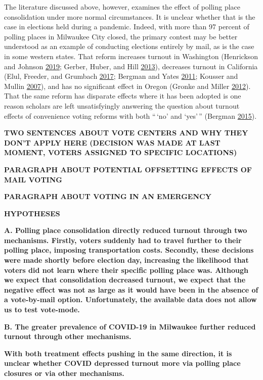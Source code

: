 \documentclass[
  12pt,
]{article}
\begin{document}
The literature discussed above, however, examines the effect of polling place consolidation under more normal circumstances. It is unclear whether that is the case in elections held during a pandemic. Indeed, with more than 97 percent of polling places in Milwaukee City closed, the primary contest may be better understood as an example of conducting elections entirely by mail, as is the case in some western states. That reform increases turnout in Washington (Henrickson and Johnson \protect\hyperlink{ref-Henrickson2019}{2019}; Gerber, Huber, and Hill \protect\hyperlink{ref-Gerber2013}{2013}), decreases turnout in California (Elul, Freeder, and Grumbach \protect\hyperlink{ref-Elul2017}{2017}; Bergman and Yates \protect\hyperlink{ref-Bergman2011}{2011}; Kousser and Mullin \protect\hyperlink{ref-Kousser2007}{2007}), and has no significant effect in Oregon (Gronke and Miller \protect\hyperlink{ref-Gronke2012}{2012}). That the same reform has disparate effects where it has been adopted is one reason scholars are left unsatisfyingly answering the question about turnout effects of convenience voting reforms with both ``\,`no' and `yes'\,'' (Bergman \protect\hyperlink{ref-Bergman2015}{2015}).

\textbf{TWO SENTENCES ABOUT VOTE CENTERS AND WHY THEY DON'T APPLY HERE (DECISION WAS MADE AT LAST MOMENT, VOTERS ASSIGNED TO SPECIFIC LOCATIONS)}

\textbf{PARAGRAPH ABOUT POTENTIAL OFFSETTING EFFECTS OF MAIL VOTING}

\textbf{PARAGRAPH ABOUT VOTING IN AN EMERGENCY}

\textbf{HYPOTHESES}

\textbf{A. Polling place consolidation directly reduced turnout through two mechanisms. Firstly, voters suddenly had to travel further to their polling place, imposing transportation costs. Secondly, these decisions were made shortly before election day, increasing the likelihood that voters did not learn where their specific polling place was. Although we expect that consolidation decreased turnout, we expect that the negative effect was not as large as it would have been in the absence of a vote-by-mail option. Unfortunately, the available data does not allow us to test vote-mode.}

\textbf{B. The greater prevalence of COVID-19 in Milwaukee further reduced turnout through other mechanisms.}

\textbf{With both treatment effects pushing in the same direction, it is unclear whether COVID depressed turnout more via polling place closures or via other mechanisms.}
\end{document}
